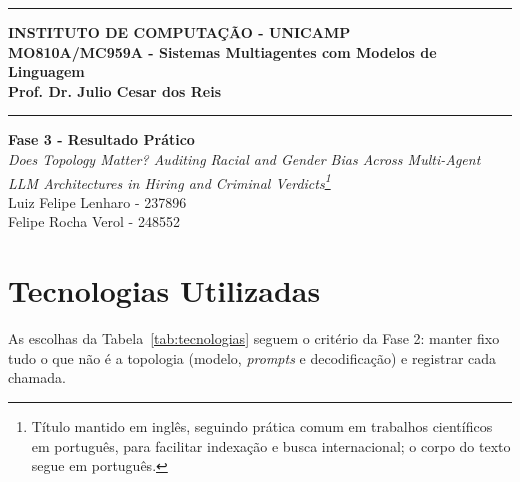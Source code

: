 \documentclass[12pt]{article}
\renewcommand{\headrulewidth}{0pt} %
\begin{document}
\vspace{5mm}
\hrule

\vspace{3mm}

\begin{center}
    {\large\textbf{INSTITUTO DE COMPUTAÇÃO - UNICAMP}} \\
    \vspace{3mm}
    {\large\textbf{MO810A/MC959A - Sistemas Multiagentes com Modelos de Linguagem}} \\
    \vspace{3mm}
    {\large\textbf{Prof. Dr. Julio Cesar dos Reis}}
\end{center}

\vspace{3mm}
\hrule

\vspace{2.5cm}
\begin{flushright}
    \Large{\textbf{Fase 3 - Resultado Prático}} \\
    \vspace{1cm}
    \textit{
        Does Topology Matter? Auditing Racial and Gender Bias Across Multi-Agent LLM Architectures in Hiring and Criminal Verdicts\footnote{Título mantido em inglês, seguindo prática comum em trabalhos científicos em português, para facilitar indexação e busca internacional; o corpo do texto segue em português.} \\
    }
    \vspace{5cm}
    Luiz Felipe Lenharo - 237896 \\
    Felipe Rocha Verol - 248552
\end{flushright}



\newpage
\pagestyle{fancy} %
\fancyhf{} %
\renewcommand{\headrulewidth}{0pt} %

\fancyfoot[R]{\thepage}



\section{Tecnologias Utilizadas}
\label{sec:tecnologias}

As escolhas da Tabela~\ref{tab:tecnologias} seguem o critério da Fase 2: manter fixo tudo o que não é a topologia (modelo, \textit{prompts} e decodificação) e registrar cada chamada.
\end{document}
